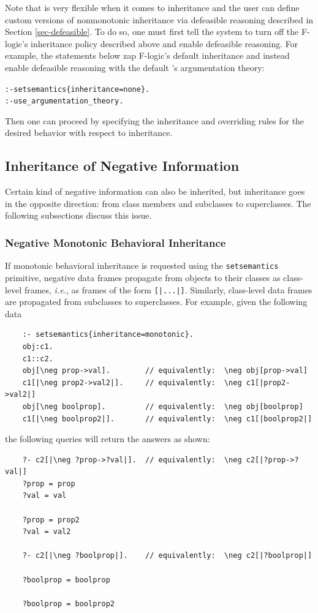 \documentclass[11pt]{article}
\newcommand{\ERGO}{\mbox{\smaller{\ensuremath{\cal{E}}\smaller{{\sc{RGO}}}}}\xspace}
\newcommand{\FLSYSTEM}{\ERGO}
\begin{document}
Note that \FLSYSTEM is very flexible when it comes to inheritance and the
user can define  custom versions of nonmonotonic inheritance
via defeasible reasoning described in Section \ref{sec-defeasible}.
To do so, one must first tell the system to turn off the F-logic's
inheritance policy described above and enable defeasible reasoning.
For example, the statements below zap F-logic's default inheritance and instead
enable defeasible reasoning with the default \FLSYSTEM's argumentation theory:
\begin{alltt}
  :- setsemantics\{inheritance=none\}.
  :- use\_argumentation\_theory.
\end{alltt}
Then one can proceed by specifying the inheritance and overriding rules
for the desired behavior with respect to inheritance.

\subsection{Inheritance of Negative Information}

Certain kind of negative information can also be inherited, but inheritance
goes in the opposite direction: from class members and subclasses to
superclasses. The following
subsections discuss this issue.

\subsubsection{Negative Monotonic Behavioral Inheritance}

If monotonic behavioral inheritance is requested using the
\texttt{setsemantics} primitive, negative data frames propagate from
objects to their classes as class-level frames, {\it i.e.}, as frames of
the form \texttt{[|...|]}.  Similarly, class-level data frames are
propagated from subclasses to superclasses. For example, given the
following data
\begin{verbatim}
    :- setsemantics{inheritance=monotonic}.
    obj:c1.
    c1::c2.
    obj[\neg prop->val].        // equivalently:  \neg obj[prop->val]
    c1[|\neg prop2->val2|].     // equivalently:  \neg c1[|prop2->val2|]
    obj[\neg boolprop].         // equivalently:  \neg obj[boolprop]
    c1[|\neg boolprop2|].       // equivalently:  \neg c1[|boolprop2|]
\end{verbatim}
the following queries will return the answers as shown:
\begin{verbatim}
    ?- c2[|\neg ?prop->?val|].  // equivalently:  \neg c2[|?prop->?val|]
    ?prop = prop
    ?val = val

    ?prop = prop2
    ?val = val2

    ?- c2[|\neg ?boolprop|].    // equivalently:  \neg c2[|?boolprop|]

    ?boolprop = boolprop

    ?boolprop = boolprop2
\end{verbatim}
\end{document}

